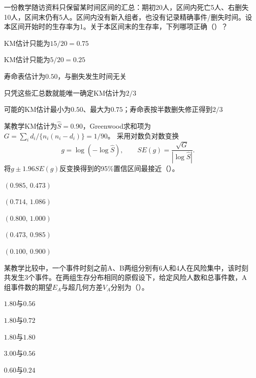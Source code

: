 \par\noindent\begin{minipage}{\linewidth}
一份教学随访资料只保留某时间区间的汇总：期初20人，区间内死亡5人、右删失10人，区间末仍有5人。区间内没有新入组者，也没有记录精确事件/删失时间。设本区间开始时的生存率为1。关于本区间末的生存率，下列哪项正确（\quad）？
\begin{choices}
\item KM估计只能为$15/20=0.75$
\item KM估计只能为$5/20=0.25$
\item 寿命表估计为$0.50$，与删失发生时间无关
\item 只凭这些汇总数就能唯一确定KM估计为$2/3$
\item 可能的KM估计最小为$0.50$、最大为$0.75$；寿命表按半数删失修正得到$2/3$
\end{choices}
\end{minipage}\par\medskip

\par\noindent\begin{minipage}{\linewidth}
某教学KM估计为$\widehat S=0.90$，Greenwood求和项为
$G=\sum_i d_i/\{n_i(n_i-d_i)\}=1/90$。
采用对数负对数变换
\[
g=\log(-\log\widehat S),\qquad
SE(g)=\frac{\sqrt G}{|\log\widehat S|}.
\]
将$g\pm1.96SE(g)$反变换得到的95\%置信区间最接近（\quad）。
\begin{choices}
\item $(0.985,\,0.473)$
\item $(0.714,\,1.086)$
\item $(0.800,\,1.000)$
\item $(0.473,\,0.985)$
\item $(0.100,\,0.900)$
\end{choices}
\end{minipage}\par\medskip

\par\noindent\begin{minipage}{\linewidth}
某教学比较中，一个事件时刻之前A、B两组分别有6人和4人在风险集中，该时刻共发生3个事件。在两组生存分布相同的原假设下，给定风险人数和总事件数，A组事件数的期望$E_A$与超几何方差$V_A$分别为（\quad）。
\begin{choices}
\item $1.80$与$0.56$
\item $1.80$与$0.72$
\item $1.80$与$1.80$
\item $3.00$与$0.56$
\item $0.60$与$0.24$
\end{choices}
\end{minipage}\par\medskip

